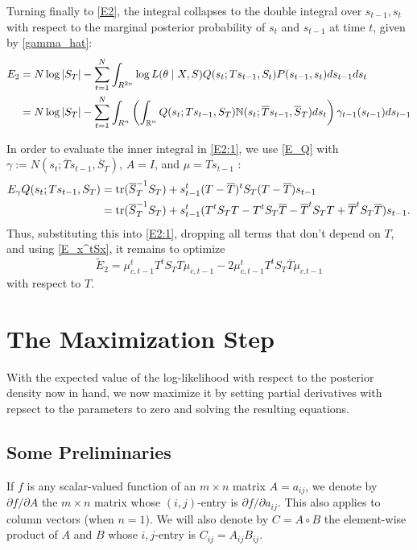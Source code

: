 \documentclass[12pt,leqno]{article}
\begin{document}
Turning finally to  \eqref{E2}, the integral collapses to the double integral over $s_{t-1},s_t$ with respect to the
marginal posterior probability of $s_t$ and $s_{t-1}$ at time $t$, given by \eqref{gamma_hat}:
\begin{equation}\label{E2:1}
  \begin{split}
    E_2 &= N\log|S_T| - \sum_{t=1}^N\int_{R^{2n}}\log{L(\theta\mid X,S)}Q(s_t;Ts_{t-1},S_t)P(s_{t-1},s_t)ds_{t-1}ds_t\\
   &= N\log|S_T| - \sum_{t=1}^N\int_{R^n}\left(\int_{{\mathbb R}^{n}}Q(s_t;Ts_{t-1},S_T)
   {\mathbb N}(s_t;\overline{T}s_{t-1},\overline{S}_T)ds_t\right)\gamma_{t-1}(s_{t-1})ds_{t-1}\\
  \end{split}
  \end{equation}

In order to evaluate the inner integral in \eqref{E2:1}, we use \eqref{E_Q} 
with $\gamma := N(s_t;\overline{T}s_{t-1},\overline{S}_T)$,  $A = I$,  and $ \mu = Ts_{t-1}$ :
\begin{align*}
  E_{\gamma}Q(s_t;Ts_{t-1},S_T) &= \text{\rm tr}(\overline{S}_T^{-1}S_T) + s_{t-1}^t(T - \overline{T})^tS_T(T - \overline{T})s_{t-1}\\
  &= \text{\rm tr}(\overline{S}_T^{-1}S_T) + s_{t-1}^t(T^tS_TT - T^tS_T\overline{T} - \overline{T}^tS_TT + \overline{T}^tS_T\overline{T})s_{t-1}. 
\end{align*}
Thus, substituting this into \eqref{E2:1}, dropping all terms that don't depend on $T$,  and using \eqref{E_x^tSx},
it remains to optimize
\begin{equation}\label{E2:2}
    \tilde{E}_2=\mu^t_{c,t-1}T^tS_TT \mu_{c,t-1}- 2\mu^t_{c,t-1}T^tS_T\overline{T} \mu_{c.t-1}
  \end{equation}
  with respect to $T$.  

\section{The Maximization Step} \label{maximization}
With the expected value of the log-likelihood with respect to the posterior density now in hand, we now maximize
it by setting partial derivatives with repsect to the parameters to zero and solving the resulting equations.

\subsection{Some Preliminaries}
If $f$ is any scalar-valued function of an $m\times{n}$ matrix $A = a_{ij}$, we denote by $\partial{f}/\partial{A}$ the 
$m\times{n}$ matrix whose $(i,j)$-entry is $\partial{f}/\partial{a_{ij}}$.  This also applies to column vectors
(when $n=1$). We will also denote by $C = A\circ{B}$ the element-wise product of $A$ and $B$ whose $i,j$-entry is
$C_{ij} = A_{ij}B_{ij}$.
\end{document}
